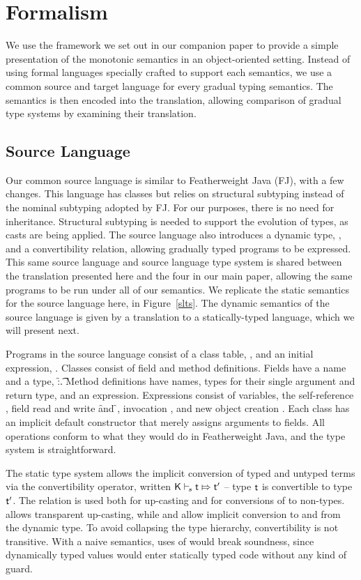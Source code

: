 \documentclass[sigconf]{acmart}
\begin{document}
\section{Formalism}

We use the framework we set out in our companion paper to provide a simple
presentation of the monotonic semantics in an object-oriented setting. Instead
of using formal languages specially crafted to support each semantics, we use
a common source and target language for every gradual typing semantics. The 
semantics is then encoded into the translation, allowing comparison of gradual 
type systems by examining their translation.

\subsection{Source Language}

Our common source language is similar to Featherweight Java (FJ), with a few
changes. This language has classes but relies on structural subtyping instead
of the nominal subtyping adopted by FJ. For our purposes, there is no need for
inheritance. Structural subtyping is needed to support the evolution of types,
as casts are being applied. The source language also introduces a dynamic
type, \any, and a convertibility relation, allowing gradually typed programs
to be expressed. This same source language and source language type system is
shared between the translation presented here and the four in our main paper,
allowing the same programs to be run under all of our semantics. We replicate
the static semantics for the source language here, in Figure~\ref{slts}. The
dynamic semantics of the source language is given by a translation to a
statically-typed language, which we will present next.

Programs in the source language consist of a class table, \K, and an initial
expression, \e. Classes consist of field and method definitions. Fields have
a name and a type, \f:\t. Method definitions have names, types for their
single argument and return type, and an expression. Expressions consist of
variables, the self-reference \this, field read and write \FRead\f and
\FWrite\f\e, invocation \Call\e\m\e, and new object creation
\New{}. Each class has an implicit default constructor that merely
assigns arguments to fields. All operations conform to what they would do in
Featherweight Java, and the type system is straightforward.

The static type system allows the implicit conversion of typed and untyped
terms via the convertibility operator, written $\ConvertE\K s\t\tp$ -- type
$\t$ is convertible to type $\tp$.  The relation is used both for up-casting
and for conversions of \any to non-\any types.   allows transparent
up-casting, while  and  allow implicit
conversion to and from the dynamic type.  To avoid collapsing the type
hierarchy, convertibility is not transitive. With a naive semantics, uses
of  would break soundness, since dynamically typed values would
enter statically typed code without any kind of guard. 
\end{document}
